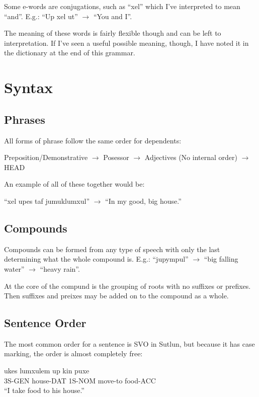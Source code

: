 \documentclass{book}
\begin{document}
Some e-words are conjugations, such as ``xel'' which I've interpreted to mean ``and''.
E.g.: ``Up xel ut'' $\rightarrow$ ``You and I''.

The meaning of these words is fairly flexible though and can be left to interpretation. If I've seen
a useful possible meaning, though, I have noted it in the dictionary at the end of this grammar.



\chapter{Syntax}
\section{Phrases}
All forms of phrase follow the same order for dependents:

\begin{center}
    Preposition/Demonstrative $\rightarrow$ Posessor $\rightarrow$ Adjectives (No internal order) $\rightarrow$ HEAD
\end{center}

An example of all of these together would be:

\begin{center}
    ``xel upes taf jumuklumxul'' $\rightarrow$ ``In my good, big house.''
\end{center}

\section{Compounds}
Compounds can be formed from any type of speech with only the last determining what
the whole compound is. E.g.: ``jupympul'' $\rightarrow$ ``big falling water'' $\rightarrow$ ``heavy rain''.

At the core of the compund is the grouping of roots with no suffixes or prefixes. Then suffixes and
preixes may be added on to the compound as a whole.


\section{Sentence Order}
The most common order for a sentence is SVO in Sutlun, but because it has case marking, the
order is almost completely free:

\begin{exe}
    \ex
    \gll ukes lumxulem up kin puxe \\
    3S-GEN house-DAT 1S-NOM move-to food-ACC \\
    \glt ``I take food to his house.''
\end{exe}
\end{document}
